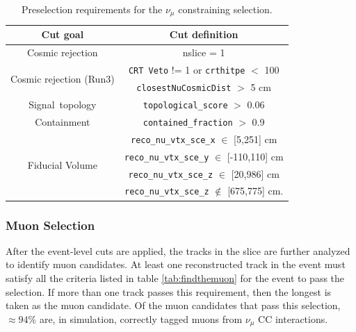 \begin{table}[h!]
\centering
\setlength{\tabcolsep}{10pt}
\renewcommand{\arraystretch}{1.25}
 \begin{tabular}{| c | c |} 
 \hline
 Cut goal & Cut definition \\
 \hline\hline
\multirow{1}{*}{ Cosmic rejection } & nslice = 1 \\
 \hline
\multirow{2}{*}{ Cosmic rejection (Run3) } & \texttt{CRT Veto} != 1 or \texttt{crthitpe} $<$ 100\\
& \texttt{closestNuCosmicDist} $>$ 5 cm\\
 \hline
\multirow{1}{*}{Signal~topology} & \texttt{topological\_score} $>$ 0.06 \\
 \hline
Containment & \texttt{contained\_fraction} $>$ 0.9 \\
 \hline
 \multirow{4}{*}{Fiducial Volume} & \texttt{reco\_nu\_vtx\_sce\_x} $\in$ [5,251] cm \\ &
\texttt{reco\_nu\_vtx\_sce\_y} $\in$ [-110,110] cm \\ &
\texttt{reco\_nu\_vtx\_sce\_z} $\in$ [20,986] cm \\ &
\texttt{reco\_nu\_vtx\_sce\_z} $\not\in$ [675,775] cm.\\
 \hline
 \end{tabular}
 \caption{\label{tab:1muNp:presel} Preselection requirements for the $\nu_\mu$ constraining selection.}
\end{table}




\subsubsection{Muon Selection}
\label{sssec:NuMUCCsel:constr:muonsel}

\par After the event-level cuts are applied, the tracks in the slice are further analyzed to identify muon candidates. At least one reconstructed track in the event must satisfy all the criteria listed in table \ref{tab:findthemuon} for the event to pass the selection. If more than one track passes this requirement, then the longest is taken as the muon candidate. Of the muon candidates that pass this selection, $\approx 94\%$ are, in simulation, correctly tagged muons from $\nu_{\mu}$ CC interactions.



